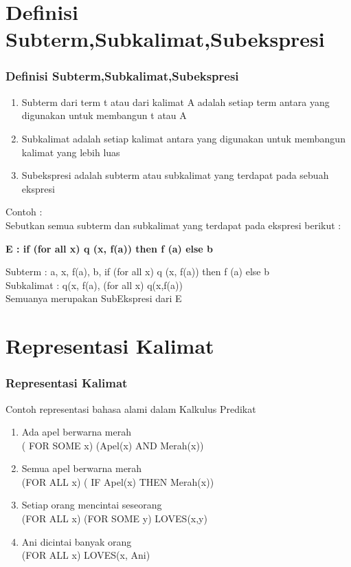 \documentclass[handout]{beamer}
\theoremstyle{definition}
\theoremstyle{example}
\begin{document}
\section{Definisi Subterm,Subkalimat,Subekspresi}
\begin{frame}
	\frametitle{Definisi Subterm,Subkalimat,Subekspresi}
	 \begin{enumerate} 
	 	\item  Subterm dari term t atau dari kalimat A adalah setiap term antara yang digunakan untuk membangun t atau A
	 	\item  Subkalimat adalah setiap kalimat antara yang digunakan untuk membangun kalimat yang lebih luas
	 	\item  Subekspresi adalah subterm atau subkalimat yang terdapat	pada sebuah ekspresi
     \end{enumerate}
     Contoh :\\
     Sebutkan semua subterm dan subkalimat yang terdapat pada ekspresi berikut :\\
     \begin{center}
     	\textbf{E : if (for all x) q (x, f(a)) then f (a) else b}
     \end{center}
     Subterm : a, x, f(a), b, if (for all x) q (x, f(a)) then f (a) else b\\
     Subkalimat : q(x, f(a), (for all x) q(x,f(a))\\
     Semuanya merupakan SubEkspresi dari E\\
\end{frame}	

\section{Representasi Kalimat}
\begin{frame}
	\frametitle{Representasi Kalimat}
      Contoh representasi bahasa alami dalam Kalkulus Predikat\\
      \begin{enumerate} 
      	\item  {\color{red} Ada} apel berwarna merah\\
      ({\color{red} FOR SOME x}) (Apel(x) AND Merah(x))
        \item  {\color{red} Semua} apel berwarna merah\\
         ({\color{red}FOR ALL x}) ( IF Apel(x) THEN Merah(x))
        \item {\color{red}Setiap} orang mencintai {\color{blue}seseorang}\\
        ({\color{red}FOR ALL x}) ({\color{blue}FOR SOME y}) LOVES(x,y) 
        \item Ani dicintai {\color{red}banyak} orang\\
        ({\color{red}FOR ALL x}) LOVES(x, Ani)
  \end{enumerate}  
 \end{frame}
        
\end{document}
